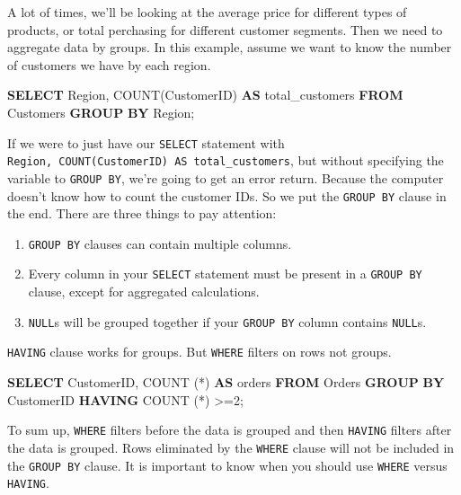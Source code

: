 \documentclass[]{book}
\makeatletter
\newenvironment{Shaded}{\begin{snugshade}}{\end{snugshade}}
\newcommand{\KeywordTok}[1]{\textcolor[rgb]{0.13,0.29,0.53}{\textbf{{#1}}}}
\newcommand{\DecValTok}[1]{\textcolor[rgb]{0.00,0.00,0.81}{{#1}}}
\newcommand{\FunctionTok}[1]{\textcolor[rgb]{0.00,0.00,0.00}{{#1}}}
\newcommand{\NormalTok}[1]{{#1}}
\providecommand{\tightlist}{%
  \setlength{\itemsep}{0pt}\setlength{\parskip}{0pt}}
\newenvironment{kframe}{%
\medskip{}
\setlength{\fboxsep}{.8em}
 \def\at@end@of@kframe{}%
 \ifinner\ifhmode%
  \def\at@end@of@kframe{\end{minipage}}%
  \begin{minipage}{\columnwidth}%
 \fi\fi%
 \def\FrameCommand##1{\hskip\@totalleftmargin \hskip-\fboxsep
 \colorbox{shadecolor}{##1}\hskip-\fboxsep
     \hskip-\linewidth \hskip-\@totalleftmargin \hskip\columnwidth}%
 \MakeFramed {\advance\hsize-\width
   \@totalleftmargin\z@ \linewidth\hsize
   \@setminipage}}%
 {\par\unskip\endMakeFramed%
 \at@end@of@kframe}
\renewenvironment{Shaded}{\begin{kframe}}{\end{kframe}}
\theoremstyle{definition}
\theoremstyle{definition}
\theoremstyle{remark}
\makeatother
\begin{document}
A lot of times, we'll be looking at the average price for different
types of products, or total perchasing for different customer segments.
Then we need to aggregate data by groups. In this example, assume we
want to know the number of customers we have by each region.

\begin{Shaded}
\begin{Highlighting}[]
\KeywordTok{SELECT} \NormalTok{Region, }\FunctionTok{COUNT}\NormalTok{(CustomerID) }\KeywordTok{AS} \NormalTok{total_customers}
\KeywordTok{FROM} \NormalTok{Customers}
\KeywordTok{GROUP} \KeywordTok{BY} \NormalTok{Region;}
\end{Highlighting}
\end{Shaded}

If we were to just have our \texttt{SELECT} statement with
\texttt{Region,\ COUNT(CustomerID)\ AS\ total\_customers}, but without
specifying the variable to \texttt{GROUP\ BY}, we're going to get an
error return. Because the computer doesn't know how to count the
customer IDs. So we put the \texttt{GROUP\ BY} clause in the end. There
are three things to pay attention:

\begin{enumerate}
\def\labelenumi{\arabic{enumi}.}
\tightlist
\item
  \texttt{GROUP\ BY} clauses can contain multiple columns.
\item
  Every column in your \texttt{SELECT} statement must be present in a
  \texttt{GROUP\ BY} clause, except for aggregated calculations.
\item
  \texttt{NULL}s will be grouped together if your \texttt{GROUP\ BY}
  column contains \texttt{NULL}s.
\end{enumerate}

\texttt{HAVING} clause works for groups. But \texttt{WHERE} filters on
rows not groups.

\begin{Shaded}
\begin{Highlighting}[]
\KeywordTok{SELECT} \NormalTok{CustomerID, }\FunctionTok{COUNT} \NormalTok{(*) }\KeywordTok{AS} \NormalTok{orders}
\KeywordTok{FROM} \NormalTok{Orders}
\KeywordTok{GROUP} \KeywordTok{BY} \NormalTok{CustomerID}
\KeywordTok{HAVING} \FunctionTok{COUNT} \NormalTok{(*) >=}\DecValTok{2}\NormalTok{;}
\end{Highlighting}
\end{Shaded}

To sum up, \texttt{WHERE} filters before the data is grouped and then
\texttt{HAVING} filters after the data is grouped. Rows eliminated by
the \texttt{WHERE} clause will not be included in the \texttt{GROUP\ BY}
clause. It is important to know when you should use \texttt{WHERE}
versus \texttt{HAVING}.
\end{document}
